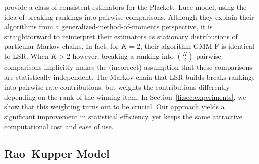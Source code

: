 \citet{azari2013generalized} provide a class of consistent estimators for the Plackett--Luce model, using the idea of breaking rankings into pairwise comparisons.
Although they explain their algorithms from a generalized-method-of-moments perspective, it is straightforward to reinterpret their estimators as stationary distributions of particular Markov chains.
In fact, for $K = 2$, their algorithm GMM-F is identical to LSR.
When $K > 2$ however, breaking a ranking into $\binom{K}{2}$ pairwise comparisons implicitly makes the (incorrect) assumption that these comparisons are statistically independent.
The Markov chain that LSR builds breaks rankings into pairwise rate contributions, but weights the contributions differently depending on the rank of the winning item.
In Section~\ref{fi:sec:experiments}, we show that this weighting turns out to be crucial.
Our approach yields a significant improvement in statistical efficiency, yet keeps the same attractive computational cost and ease of use.


\subsection{Rao--Kupper Model}
\label{fi:sec:ties}

